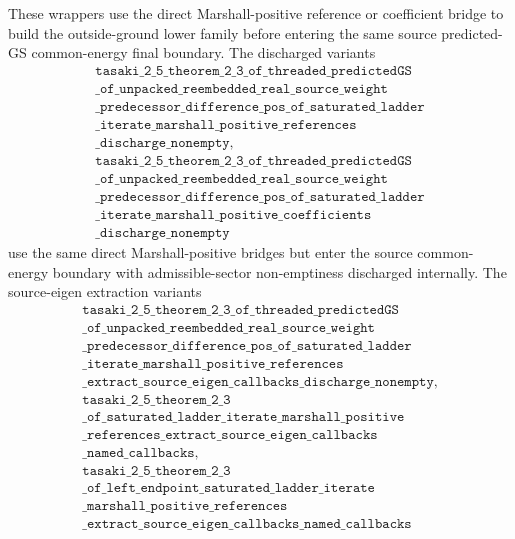 \documentclass[a4paper,11pt]{article}
\begin{document}
These wrappers use the direct Marshall-positive reference or coefficient
bridge to build the outside-ground lower family before entering the same
source predicted-GS common-energy final boundary.
The discharged variants
\[
\begin{gathered}
\texttt{tasaki\_2\_5\_theorem\_2\_3\_of\_threaded\_predictedGS}\\
\texttt{\_of\_unpacked\_reembedded\_real\_source\_weight}\\
\texttt{\_predecessor\_difference\_pos\_of\_saturated\_ladder}\\
\texttt{\_iterate\_marshall\_positive\_references}\\
\texttt{\_discharge\_nonempty},\\
\texttt{tasaki\_2\_5\_theorem\_2\_3\_of\_threaded\_predictedGS}\\
\texttt{\_of\_unpacked\_reembedded\_real\_source\_weight}\\
\texttt{\_predecessor\_difference\_pos\_of\_saturated\_ladder}\\
\texttt{\_iterate\_marshall\_positive\_coefficients}\\
\texttt{\_discharge\_nonempty}
\end{gathered}
\]
use the same direct Marshall-positive bridges but enter the source
common-energy boundary with admissible-sector non-emptiness discharged
internally.
The source-eigen extraction variants
\[
\begin{gathered}
\texttt{tasaki\_2\_5\_theorem\_2\_3\_of\_threaded\_predictedGS}\\
\texttt{\_of\_unpacked\_reembedded\_real\_source\_weight}\\
\texttt{\_predecessor\_difference\_pos\_of\_saturated\_ladder}\\
\texttt{\_iterate\_marshall\_positive\_references}\\
\texttt{\_extract\_source\_eigen\_callbacks\_discharge\_nonempty},\\
\texttt{tasaki\_2\_5\_theorem\_2\_3}\\
\texttt{\_of\_saturated\_ladder\_iterate\_marshall\_positive}\\
\texttt{\_references\_extract\_source\_eigen\_callbacks}\\
\texttt{\_named\_callbacks},\\
\texttt{tasaki\_2\_5\_theorem\_2\_3}\\
\texttt{\_of\_left\_endpoint\_saturated\_ladder\_iterate}\\
\texttt{\_marshall\_positive\_references}\\
\texttt{\_extract\_source\_eigen\_callbacks\_named\_callbacks}
\end{gathered}
\]
\end{document}
